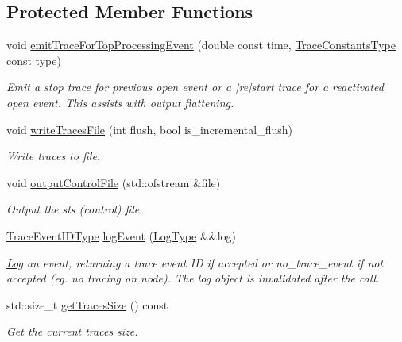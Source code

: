 \subsection*{Protected Member Functions}
\begin{DoxyCompactItemize}
\item 
void \hyperlink{structvt_1_1trace_1_1_trace_lite_a6d33deb4bef608ff3c68dcf80b2fcc42}{emit\+Trace\+For\+Top\+Processing\+Event} (double const time, \hyperlink{namespacevt_1_1trace_acf454dfbd581b0ebae895f90b5927a1d}{Trace\+Constants\+Type} const type)
\begin{DoxyCompactList}\small\item\em Emit a \textquotesingle{}stop\textquotesingle{} trace for previous open event or a \textquotesingle{}\mbox{[}re\mbox{]}start\textquotesingle{} trace for a reactivated open event. This assists with output flattening. \end{DoxyCompactList}\item 
void \hyperlink{structvt_1_1trace_1_1_trace_lite_aa385172051bc8f3fc58a345fec10eae2}{write\+Traces\+File} (int flush, bool is\+\_\+incremental\+\_\+flush)
\begin{DoxyCompactList}\small\item\em Write traces to file. \end{DoxyCompactList}\item 
void \hyperlink{structvt_1_1trace_1_1_trace_lite_a7b60eedbf68a4989a1566f2cf85d94dd}{output\+Control\+File} (std\+::ofstream \&file)
\begin{DoxyCompactList}\small\item\em Output the sts (control) file. \end{DoxyCompactList}\item 
\hyperlink{namespacevt_1_1trace_a64a7185f3e102df8d8258f263ccd1582}{Trace\+Event\+I\+D\+Type} \hyperlink{structvt_1_1trace_1_1_trace_lite_aeb468f1222761674e4ffb0cfa27f0641}{log\+Event} (\hyperlink{structvt_1_1trace_1_1_trace_lite_aeb73e523d31829d3163c877b145afa2a}{Log\+Type} \&\&log)
\begin{DoxyCompactList}\small\item\em \hyperlink{structvt_1_1trace_1_1_log}{Log} an event, returning a trace event ID if accepted or {\ttfamily no\+\_\+trace\+\_\+event} if not accepted (eg. no tracing on node). The log object is invalidated after the call. \end{DoxyCompactList}\item 
std\+::size\+\_\+t \hyperlink{structvt_1_1trace_1_1_trace_lite_a1cdbccebe00aec90174e93b3d1fa0bcf}{get\+Traces\+Size} () const
\begin{DoxyCompactList}\small\item\em Get the current traces size. \end{DoxyCompactList}\end{DoxyCompactItemize}
